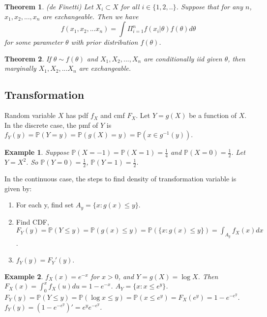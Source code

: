 \documentclass[11pt]{article}
\def\BP{{\bf P}}
\def\BP{{\mathbb P}}
\newtheorem{theorem}{Theorem}[section]
\newtheorem{example}{Example}[section]
\begin{document}
\begin{theorem}(de Finetti)
Let $X_i \subset X$ for all $i\in\{1, 2, ..\}$. Suppose that for any $n$, $x_1, x_2, ..., x_n$ are exchangeable. Then we have \[f(x_1, x_2, ... x_n) = \int \Pi_{i=1}^n f(x_i | \theta) f(\theta) d\theta\] for some parameter $\theta$ with prior distribution $f(\theta)$.
\end{theorem}

\begin{theorem}
If $\theta \sim f(\theta)$ and $X_1, X_2, ..., X_n$ are conditionally iid given $\theta$, then marginally $X_1, X_2, ... X_n$ are exchangeable.
\end{theorem}

\subsection{Transformation}
Random variable $X$ has pdf $f_X$ and cmf $F_X$. Let $Y = g(X)$ be a function of $X$. In the discrete case, the pmf of $Y$ is $f_Y(y) = \BP(Y = y) = \BP(g(X) = y) = \BP(x \in g^{-1}(y))$.

\begin{example}
Suppose $\BP(X=-1) = \BP(X=1) = \frac{1}{4}$ and $\BP(X=0) = \frac{1}{2}$. Let $Y=X^2$. So $\BP(Y=0) = \frac{1}{2}$, $\BP(Y=1)=\frac{1}{2}$.
\end{example}

In the continuous case, the steps to find density of transformation variable is given by:
\begin{enumerate}
\item For each y, find set $A_y = \{x:g(x) \leq y\}$.
\item Find CDF, $F_Y(y) = \BP(Y \leq y) = \BP(g(x) \leq y) = \BP(\{x: g(x)\leq y\}) = \int_{A_y} f_X(x) dx$.
\item $f_Y(y) = F_Y'(y)$.
\end{enumerate}

\begin{example}
  $f_X(x) = e^{-x}$ for $x>0$, and $Y=g(X)=\log X$. Then $F_X(x) = \int_0^x f_X(u) du = 1 - e^{-x}$. $A_Y = \{x: x \leq e^y\}$. $F_Y(y) = \BP(Y \leq y) = \BP(\log x \leq y) = \BP(x \leq e^y) = F_X(e^y) = 1 - e^{-e^y}$. $f_Y(y) = (1 - e^{-e^y})' = e^y e^{-e^y}$.
\end{example}
\end{document}
